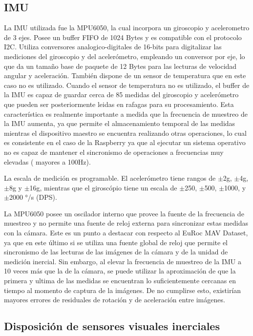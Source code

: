 

\subsection{IMU}

La IMU utilizada fue la MPU6050, la cual incorpora un giroscopio y acelerometro de 3 ejes. Posee un buffer FIFO de 1024 Bytes y es compatible con el protocolo  I2C. Utiliza conversores analogico-digitales de 16-bits para digitalizar las mediciones del giroscopio y del acelerómetro, empleando un conversor por eje, lo que da un tamaño base de paquete de 12 Bytes para las lecturas de velocidad angular y aceleración. También dispone de un sensor de temperatura que en este caso no es utilizado. 
Cuando el sensor de temperatura no es utilizado, el buffer de la IMU es capaz de guardar cerca de 85 medidas del giroscopio y acelerómetro que pueden ser posteriormente leidas en rafagas para su procesamiento. Esta característica es realmente importante a medida que la frecuencia de muestreo de la IMU aumenta, ya que permite el almacenamiento temporal de las medidas mientras el dispositivo maestro se encuentra realizando otras operaciones, lo cual es consistente en el caso de la Raspberry ya que al ejecutar un sistema operativo no es capaz de mantener el sincronismo de operaciones a frecuencias muy elevadas ( mayores a 100Hz).

La escala de medición es programable. El acelerómetro tiene rangos de $\pm$2g, $\pm$4g, $\pm$8g y $\pm$16g, mientras que el giroscópio tiene un escala de $\pm$250, $\pm$500, $\pm$1000, y $\pm$2000 °/s (DPS).

La MPU6050 posee un oscilador interno que provee la fuente de la frecuencia de muestreo y no permite una fuente de reloj externa para sincronizar estas medidas con la cámara. Este es un punto a destacar con respecto al EuRoc MAV Dataset, ya que en este último si se utiliza una fuente global de reloj que permite el sincronismo de las lecturas de las imágenes de la cámara y de la unidad de medición inercial. Sin embargo, al elevar la frecuencia de muestreo de la IMU a 10 veces más que la de la cámara, se puede utilizar la aproximación de que la primera y ultima de las medidas se encuentran lo suficientemente cercanas en tiempo al momento de captura de la imágenes. De no cumplirse esto, existirían mayores errores de residuales de rotación y de aceleración  entre imágenes.
 

\subsection{Disposición de sensores visuales inerciales}

